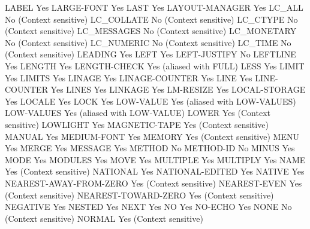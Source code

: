LABEL                           Yes
LARGE-FONT                      Yes
LAST                            Yes
LAYOUT-MANAGER                  Yes
LC_ALL                          No (Context sensitive)
LC_COLLATE                      No (Context sensitive)
LC_CTYPE                        No (Context sensitive)
LC_MESSAGES                     No (Context sensitive)
LC_MONETARY                     No (Context sensitive)
LC_NUMERIC                      No (Context sensitive)
LC_TIME                         No (Context sensitive)
LEADING                         Yes
LEFT                            Yes
LEFT-JUSTIFY                    No
LEFTLINE                        Yes
LENGTH                          Yes
LENGTH-CHECK                    Yes (aliased with FULL)
LESS                            Yes
LIMIT                           Yes
LIMITS                          Yes
LINAGE                          Yes
LINAGE-COUNTER                  Yes
LINE                            Yes
LINE-COUNTER                    Yes
LINES                           Yes
LINKAGE                         Yes
LM-RESIZE                       Yes
LOCAL-STORAGE                   Yes
LOCALE                          Yes
LOCK                            Yes
LOW-VALUE                       Yes (aliased with LOW-VALUES)
LOW-VALUES                      Yes (aliased with LOW-VALUE)
LOWER                           Yes (Context sensitive)
LOWLIGHT                        Yes
MAGNETIC-TAPE                   Yes (Context sensitive)
MANUAL                          Yes
MEDIUM-FONT                     Yes
MEMORY                          Yes (Context sensitive)
MENU                            Yes
MERGE                           Yes
MESSAGE                         Yes
METHOD                          No
METHOD-ID                       No
MINUS                           Yes
MODE                            Yes
MODULES                         Yes
MOVE                            Yes
MULTIPLE                        Yes
MULTIPLY                        Yes
NAME                            Yes (Context sensitive)
NATIONAL                        Yes
NATIONAL-EDITED                 Yes
NATIVE                          Yes
NEAREST-AWAY-FROM-ZERO          Yes (Context sensitive)
NEAREST-EVEN                    Yes (Context sensitive)
NEAREST-TOWARD-ZERO             Yes (Context sensitive)
NEGATIVE                        Yes
NESTED                          Yes
NEXT                            Yes
NO                              Yes
NO-ECHO                         Yes
NONE                            No (Context sensitive)
NORMAL                          Yes (Context sensitive)
